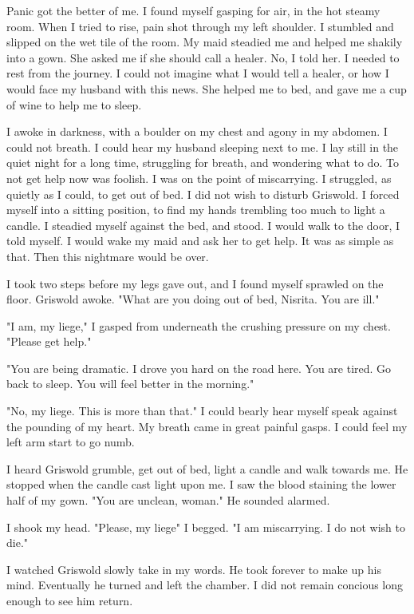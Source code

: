 \documentclass{article}
\begin{document}
Panic got the better of me. I found myself gasping for air, in the hot steamy room. When I tried to rise, pain shot through my left shoulder. I stumbled and slipped on the wet tile of the room. My maid steadied me and helped me shakily into a gown. She asked me if she should call a healer. No, I told her. I needed to rest from the journey. I could not imagine what I would tell a healer, or how I would face my husband with this news. She helped me to bed, and gave me a cup of wine to help me to sleep.

I awoke in darkness, with a boulder on my chest and agony in my abdomen. I could not breath. I could hear my husband sleeping next to me. I lay still in the quiet night for a long time, struggling for breath, and wondering what to do. To not get help now was foolish. I was on the point of miscarrying. I struggled, as quietly as I could, to get out of bed. I did not wish to disturb Griswold. I forced myself into a sitting position, to find my hands trembling too much to light a candle. I steadied myself against the bed, and stood. I would walk to the door, I told myself. I would wake my maid and ask her to get help. It was as simple as that. Then this nightmare would be over.

I took two steps before my legs gave out, and I found myself sprawled on the floor. Griswold awoke. "What are you doing out of bed, Nisrita. You are ill."

"I am, my liege," I gasped from underneath the crushing pressure on my chest. "Please get help."

"You are being dramatic. I drove you hard on the road here. You are tired. Go back to sleep. You will feel better in the morning."

"No, my liege. This is more than that." I could bearly hear myself speak against the pounding of my heart. My breath came in great painful gasps. I could feel my left arm start to go numb. 

I heard Griswold grumble, get out of bed, light a candle and walk towards me. He stopped when the candle cast light upon me. I saw the blood staining the lower half of my gown. "You are unclean, woman." He sounded alarmed.

I shook my head. "Please, my liege" I begged. "I am miscarrying. I do not wish to die."

I watched Griswold slowly take in my words. He took forever to make up his mind. Eventually he turned and left the chamber. I did not remain concious long enough to see him return.
\end{document}
